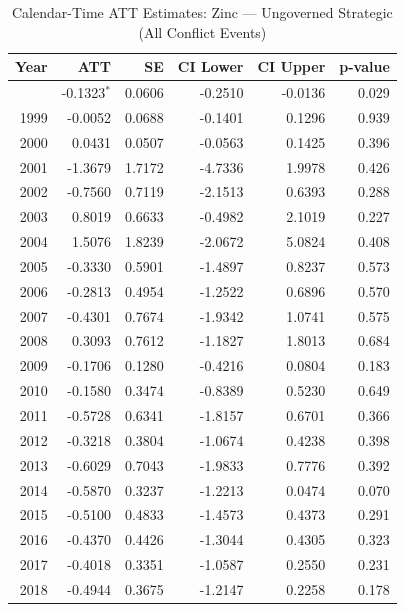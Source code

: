\begin{longtable}{rrrrrr}
\caption{Calendar-Time ATT Estimates: Zinc --- Ungoverned Strategic (All Conflict Events)} \label{tab:cal_zinc} \\
\toprule
\textbf{Year} & \textbf{ATT} & \textbf{SE} & \textbf{CI Lower} & \textbf{CI Upper} & \textbf{p-value} \\
\midrule
\endfirsthead
\bottomrule
\endlastfoot
1998 & -0.1323$^{*}$ & 0.0606 & -0.2510 & -0.0136 & 0.029 \\
1999 & -0.0052 & 0.0688 & -0.1401 & 0.1296 & 0.939 \\
2000 & 0.0431 & 0.0507 & -0.0563 & 0.1425 & 0.396 \\
2001 & -1.3679 & 1.7172 & -4.7336 & 1.9978 & 0.426 \\
2002 & -0.7560 & 0.7119 & -2.1513 & 0.6393 & 0.288 \\
2003 & 0.8019 & 0.6633 & -0.4982 & 2.1019 & 0.227 \\
2004 & 1.5076 & 1.8239 & -2.0672 & 5.0824 & 0.408 \\
2005 & -0.3330 & 0.5901 & -1.4897 & 0.8237 & 0.573 \\
2006 & -0.2813 & 0.4954 & -1.2522 & 0.6896 & 0.570 \\
2007 & -0.4301 & 0.7674 & -1.9342 & 1.0741 & 0.575 \\
2008 & 0.3093 & 0.7612 & -1.1827 & 1.8013 & 0.684 \\
2009 & -0.1706 & 0.1280 & -0.4216 & 0.0804 & 0.183 \\
2010 & -0.1580 & 0.3474 & -0.8389 & 0.5230 & 0.649 \\
2011 & -0.5728 & 0.6341 & -1.8157 & 0.6701 & 0.366 \\
2012 & -0.3218 & 0.3804 & -1.0674 & 0.4238 & 0.398 \\
2013 & -0.6029 & 0.7043 & -1.9833 & 0.7776 & 0.392 \\
2014 & -0.5870 & 0.3237 & -1.2213 & 0.0474 & 0.070 \\
2015 & -0.5100 & 0.4833 & -1.4573 & 0.4373 & 0.291 \\
2016 & -0.4370 & 0.4426 & -1.3044 & 0.4305 & 0.323 \\
2017 & -0.4018 & 0.3351 & -1.0587 & 0.2550 & 0.231 \\
2018 & -0.4944 & 0.3675 & -1.2147 & 0.2258 & 0.178 \\
\end{longtable}
